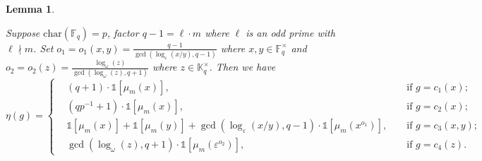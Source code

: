 \documentclass[10pt,a4paper]{amsart}
\newtheorem{lemma}{Lemma}
\newcommand{\BF}{\mathbb{F}}
\newcommand{\BK}{\mathbb{K}}
\newcommand{\fk}[1]{\left[#1\right]}
\newcommand{\one}{\mathds{1}}
\newcommand{\pt}[1]{\left(#1\right)}
\begin{document}
\begin{lemma}\label{eta_lemma}
	
	Suppose $\mathrm{char}(\BF_q) = p$, factor $q - 1 = \ell \cdot m$ where $\ell$ is an odd prime with $\ell \nmid m$. Set $o_1 = o_1(x, y) = \frac{q - 1}{\gcd\pt{\log_\varepsilon(x/y), q - 1}}$ where $x, y \in \BF_q^\times$ and $o_2 = o_2(z) = \frac{\log_\omega(z)}{\gcd\pt{\log_\omega(z), q + 1}}$ where $z \in \BK_q^\times$. Then we have
	\[\eta(g) = \left\{\begin{aligned}
		&(q + 1)\cdot\one\fk{{\mu_{m}(x)}},&&\text{ if } g = c_1(x);\\
		&\pt{{q}{p^{-1}} + 1}\cdot\one\fk{{\mu_{m}(x)}}, &&\text{ if } g = c_2(x);\\
		&\one\fk{\mu_m(x)} + \one\fk{\mu_m(y)} + \gcd{(\log_\varepsilon\pt{{x}/{y}}, q - 1)}\cdot\one\fk{\mu_{m}(x^{o_1})},&&\text{ if } g = c_3(x, y);\\
		&\gcd(\log_\omega(z), q + 1)\cdot\one\fk{\mu_{m}\pt{\varepsilon^{o_2}}},&&\text{ if } g = c_4(z).
	\end{aligned}\right.\]	
	
\end{lemma}
\end{document}
